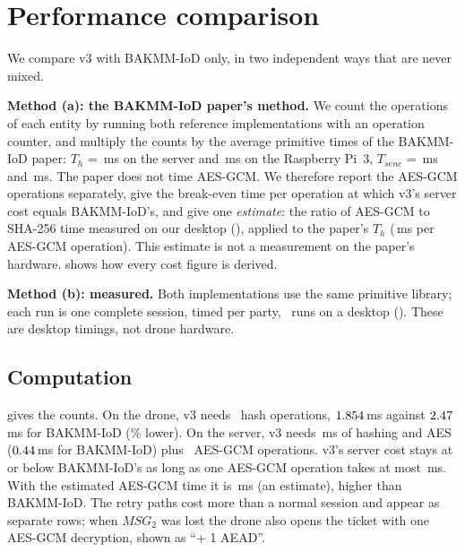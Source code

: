 \section{Performance comparison}\label{sec:performance}

We compare v3 with BAKMM-IoD only, in two independent ways that are never mixed.

\textbf{Method (a): the BAKMM-IoD paper's method.} We count the operations of each entity by running both reference
implementations with an operation counter, and multiply the counts by the average primitive times of the BAKMM-IoD paper:
$T_h$ = \ThServer\,ms on the server and \ThDrone\,ms on the Raspberry Pi~3, $T_{senc}$ = \TsencServer\,ms and
\TsencDrone\,ms. The paper does not time AES-GCM. We therefore report the AES-GCM operations separately, give the break-even
time per operation at which v3's server cost equals BAKMM-IoD's, and give one \emph{estimate}: the ratio of AES-GCM to SHA-256
time measured on our desktop (\AEADRatio), applied to the paper's $T_h$ (\AEADEst\,ms per AES-GCM operation). This estimate is
not a measurement on the paper's hardware.  shows how every cost figure is derived.

\textbf{Method (b): measured.} Both implementations use the same primitive library; each run is one complete session, timed per
party, \MeasRuns\ runs on a desktop (\MeasCPU). These are desktop timings, not drone hardware.

\subsection{Computation}
 gives the counts. On the drone, v3 needs \DroneHashesVthree\ hash operations, $1.854$\,ms against
$2.47$\,ms for BAKMM-IoD (\PctDrone\% lower). On the server, v3 needs \CostServerVthree\,ms of hashing and AES
($0.44$\,ms for BAKMM-IoD) plus \CostServerAEADops\ AES-GCM operations. v3's server cost stays at or below
BAKMM-IoD's as long as one AES-GCM operation takes at most \BreakEvenAEAD\,ms. With the estimated AES-GCM time it is
\CostServerWithAEAD\,ms (an estimate), higher than BAKMM-IoD. The retry paths cost more than a normal session and appear as
separate rows; when $MSG_2$ was lost the drone also opens the ticket with one AES-GCM decryption, shown as ``+ 1 AEAD''.



